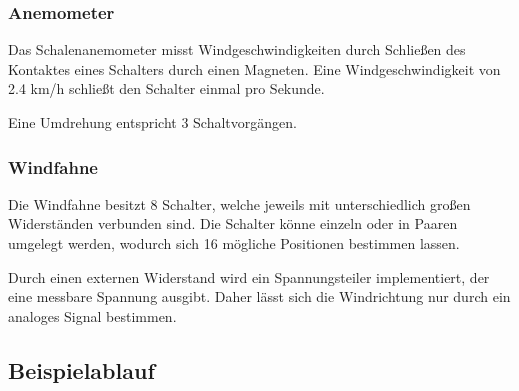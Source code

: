 \documentclass{article}
\begin{document}
      \subsubsection{Anemometer}

        Das Schalenanemometer misst Windgeschwindigkeiten durch Schließen des Kontaktes eines Schalters durch einen Magneten.
        Eine Windgeschwindigkeit von 2.4 km/h schließt den Schalter einmal pro Sekunde.

        Eine Umdrehung entspricht 3 Schaltvorgängen.

      \subsubsection{Windfahne}

        Die Windfahne besitzt 8 Schalter, welche jeweils mit unterschiedlich großen Widerständen verbunden sind.
        Die Schalter könne einzeln oder in Paaren umgelegt werden, wodurch sich 16 mögliche Positionen bestimmen lassen.

        Durch einen externen Widerstand wird ein Spannungsteiler implementiert, der eine messbare Spannung ausgibt.
        Daher lässt sich die Windrichtung nur durch ein analoges Signal bestimmen.

    \subsection{Beispielablauf}
\end{document}
